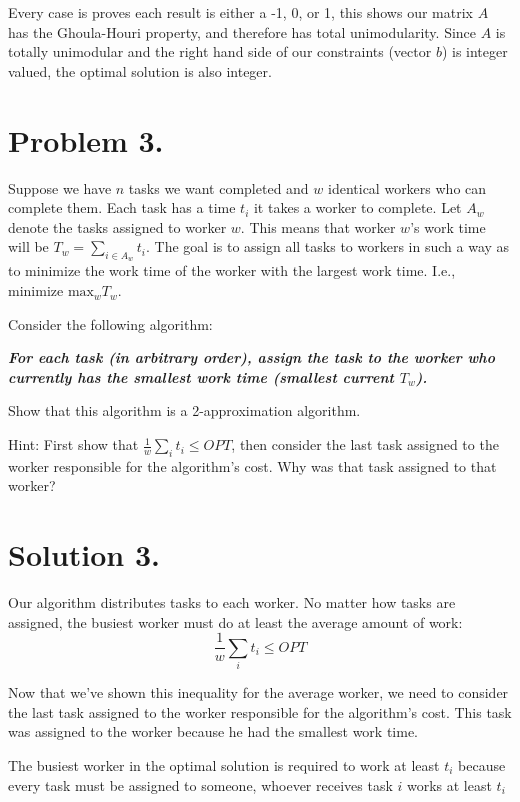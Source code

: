\documentclass[11pt]{article}
\begin{document}
Every case is proves each result is either a -1, 0, or 1, this shows our matrix \(A\) has the Ghoula-Houri property, and therefore has total unimodularity. Since \(A\) is totally unimodular and the right hand side of our constraints (vector \(b\)) is integer valued, the optimal solution is also integer.

\newpage

\section{Problem 3.}
\label{sec:orgb1c4d71}

Suppose we have \(n\) tasks we want completed and \(w\) identical workers who can complete them. Each task has a time \(t_i\) it takes a worker to complete. Let \(A_w\) denote the tasks assigned to worker \(w\). This means that worker \(w\)'s work time will be \(T_w = \sum_{i \in A_w} t_i\). The goal is to assign all tasks to workers in such a way as to minimize the work time of the worker with the largest work time. I.e., minimize \(\text{max}_w T_w\).

Consider the following algorithm:

\textbf{\emph{For each task (in arbitrary order), assign the task to the worker who currently has the smallest work time (smallest current \(T_w\)).}}

Show that this algorithm is a 2-approximation algorithm.

Hint: First show that \(\frac{1}{w} \sum_i t_i \leq OPT\), then consider the last task assigned to the worker responsible for the algorithm's cost. Why was that task assigned to that worker?

\section{Solution 3.}
\label{sec:org807d160}

Our algorithm distributes tasks to each worker. No matter how tasks are assigned, the busiest worker must do at least the average amount of work:
\[ \frac{1}{w} \sum_{i} t_i \leq OPT \]

Now that we've shown this inequality for the average worker, we need to consider the last task assigned to the worker responsible for the algorithm's cost. This task was assigned to the worker because he had the smallest work time.

The busiest worker in the optimal solution is required to work at least \(t_i\) because every task must be assigned to someone, whoever receives task \(i\) works at least \(t_i\) 
\end{document}
